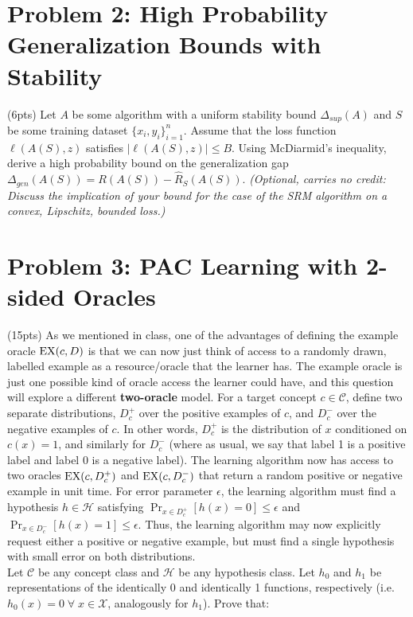 \documentclass[11pt]{article}
\newcommand{\calX}{{\mathcal{X}}}
\newcommand{\calC}{{\mathcal{C}}}
\newcommand{\calH}{{\mathcal{H}}}
\newcommand{\blue}[1]{{\color{blue}#1}}
\newcommand{\exampleoracle}{{\text{\rm EX}}}
\begin{document}
\section*{Problem 2: High Probability Generalization Bounds with  Stability}

 (\blue{6pts}) Let $A$ be some algorithm with a uniform stability bound $\Delta_{sup}(A)$ and $S$ be some training dataset $\{x_i,y_i\}_{i=1}^n$. Assume that the loss function $\ell(A(S), z)$ satisfies $|\ell(A(S), z)|\le B$. Using McDiarmid's inequality, derive a high probability bound on the generalization gap $\Delta_{gen}(A(S))=R(A(S))-\hat{R}_{S}(A(S))$. \emph{(Optional, carries no credit: Discuss the implication of your bound for the case of the SRM algorithm on a convex, Lipschitz, bounded loss.)}

\section*{Problem 3: PAC Learning with 2-sided Oracles}

(\blue{15pts}) As we mentioned in class, one of the advantages of defining the example oracle $\exampleoracle(c, D)$ is that we can now just think of access to a randomly drawn, labelled example as a resource/oracle that the learner has. The example oracle is just one possible kind of oracle access the learner could have, and this question will explore a different \textbf{two-oracle} model. For a target concept $c \in \calC$, define two separate distributions, $D_c^+$ over the positive examples of $c$, and $D_c^-$ over the negative examples of $c$. In other words, $D_c^+$ is the distribution of $x$ conditioned on $c(x)=1$, and similarly for $D_c^-$ (where as usual, we say that label 1 is a positive label and label 0 is a negative label). The learning algorithm now has access to two oracles $\exampleoracle(c, D_c^+)$ and  $\exampleoracle(c, D_c^-)$ that return a random positive or negative example in unit time. For error parameter $\epsilon$, the learning algorithm must find a hypothesis $h\in \calH$ satisfying $\Pr_{x\in D_c^+}[h(x)=0]\le \epsilon$ and $\Pr_{x\in D_c^-}[h(x)=1]\le \epsilon$. Thus, the learning algorithm may now explicitly request either a positive or negative example, but must find a single hypothesis with small error on both distributions.\\

Let $\calC$ be any concept class and $\calH$ be any hypothesis class. Let $h_0$ and $h_1$ be representations of the identically 0 and identically 1 functions, respectively (i.e. $h_0(x)=0 \; \forall \; x \in \calX$, analogously for $h_1$). Prove that:
\end{document}
